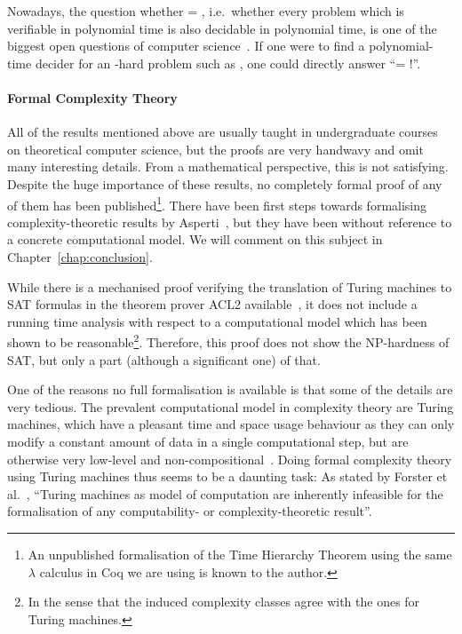 Nowadays, the question whether \PC{} = \NP{}, i.e.\ whether every problem which is verifiable in polynomial time is also decidable in polynomial time, is one of the biggest open questions of computer science~\cite{claymath}. 
If one were to find a polynomial-time decider for an \NP{}-hard problem such as \SAT{}, one could directly answer ``\PC{}= \NP{}!''.

\paragraph{Formal Complexity Theory}
All of the results mentioned above are usually taught in undergraduate courses on theoretical computer science, but the proofs are very handwavy and omit many interesting details. From a mathematical perspective, this is not satisfying.
Despite the huge importance of these results, no completely formal proof of any of them has been published\footnote{An unpublished formalisation of the Time Hierarchy Theorem using the same $\lambda$ calculus in Coq we are using is known to the author.}. 
There have been first steps towards formalising complexity-theoretic results by Asperti~\cite{asperti:reverse_complexity, asperti:borodin}, but they have been without reference to a concrete computational model. We will comment on this subject in Chapter~\ref{chap:conclusion}.

While there is a mechanised proof verifying the translation of Turing machines to SAT formulas in the theorem prover ACL2 available~\cite{gamboa:cook}, it does not include a running time analysis with respect to a computational model which has been shown to be reasonable\footnote{In the sense that the induced complexity classes agree with the ones for Turing machines.}. Therefore, this proof does not show the NP-hardness of SAT, but only a part (although a significant one) of that.

One of the reasons no full formalisation is available is that some of the details are very tedious. The prevalent computational model in complexity theory are Turing machines, which have a pleasant time and space usage behaviour as they can only modify a constant amount of data in a single computational step, but are otherwise very low-level and non-compositional~\cite{ForsterEtAl:2019:VerifiedTMs}.
Doing formal complexity theory using Turing machines thus seems to be a daunting task: As stated by Forster et al.~\cite{ForsterEtAl:2019:VerifiedTMs}, ``Turing machines as model of computation are inherently infeasible for the formalisation of any computability- or complexity-theoretic result''. 


